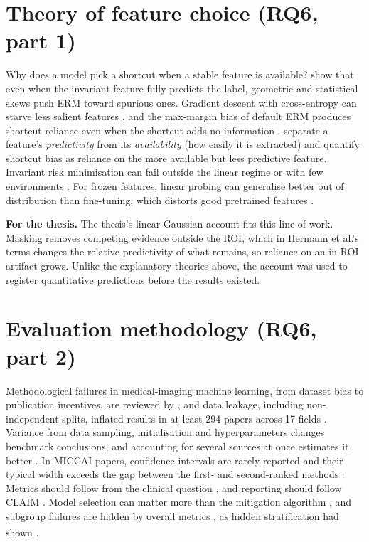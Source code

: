 \documentclass[11pt,a4paper]{article}
\newcommand{\takeaway}[1]{\par\smallskip\noindent\colorbox{gray!12}{\parbox{\dimexpr\linewidth-2\fboxsep}{\small\textbf{For the thesis.} #1}}\par\medskip}
\newcommand{\bg}{\textsuperscript{\dag}}
\begin{document}
\section{Theory of feature choice (RQ6, part 1)}\label{sec:theory}
Why does a model pick a shortcut when a stable feature is available? \citet{nagarajan2021understanding} show that even
when the invariant feature fully predicts the label, geometric and statistical skews push ERM toward spurious ones.
Gradient descent with cross-entropy can starve less salient features \citep{pezeshki2021gradient}, and the max-margin
bias of default ERM produces shortcut reliance even when the shortcut adds no information \citep{puli2023dontblame}.
\citet{hermann2024foundations} separate a feature's \emph{predictivity} from its \emph{availability} (how easily it is
extracted) and quantify shortcut bias as reliance on the more available but less predictive feature. Invariant risk
minimisation can fail outside the linear regime or with few environments \citep{rosenfeld2021risks}. For frozen
features, linear probing can generalise better out of distribution than fine-tuning, which distorts good pretrained
features \citep{kumar2022finetuning}.
\takeaway{The thesis's linear-Gaussian account fits this line of work. Masking removes competing evidence outside the
ROI, which in Hermann et al.'s terms changes the relative predictivity of what remains, so reliance on an in-ROI
artifact grows. Unlike the explanatory theories above, the account was used to register quantitative predictions
before the results existed.}

\section{Evaluation methodology (RQ6, part 2)}\label{sec:eval}
Methodological failures in medical-imaging machine learning, from dataset bias to publication incentives, are reviewed
by \citet{varoquaux2022failures}, and data leakage, including non-independent splits, inflated results in at least 294
papers across 17 fields \citep{kapoor2023leakage}. Variance from data sampling, initialisation and hyperparameters
changes benchmark conclusions, and accounting for several sources at once estimates it better
\citep{bouthillier2021variance}. In MICCAI papers, confidence intervals are rarely reported and their typical width
exceeds the gap between the first- and second-ranked methods \citep{christodoulou2024ci}. Metrics should follow from
the clinical question \citep{maierhein2024metrics}, and reporting should follow CLAIM \citep{tejani2024claim}. Model
selection can matter more than the mitigation algorithm \citep{zong2023medfair,yang2023change}, and subgroup failures
are hidden by overall metrics \citep{yang2024limits}, as hidden stratification had shown
\citep{oakden2020hidden}\bg.
\end{document}
